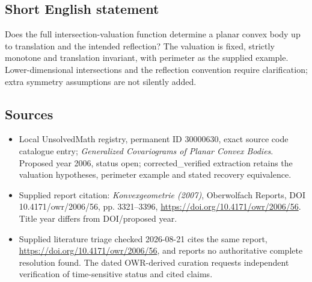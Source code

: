 \documentclass[11pt]{article}
\begin{document}
\subsection{Short English statement}
Does the full intersection-valuation function determine a planar convex body up to translation and the intended reflection? The valuation is fixed, strictly monotone and translation invariant, with perimeter as the supplied example. Lower-dimensional intersections and the reflection convention require clarification; extra symmetry assumptions are not silently added.
\subsection{Sources}
\begin{itemize}
\item Local UnsolvedMath registry, permanent ID 30000630, exact source code catalogue entry; \emph{Generalized Covariograms of Planar Convex Bodies}. Proposed year 2006, status open; corrected\_verified extraction retains the valuation hypotheses, perimeter example and stated recovery equivalence.
\item Supplied report citation: \emph{Konvexgeometrie (2007)}, Oberwolfach Reports, DOI 10.4171/owr/2006/56, pp. 3321--3396, \url{https://doi.org/10.4171/owr/2006/56}. Title year differs from DOI/proposed year.
\item Supplied literature triage checked 2026-08-21 cites the same report, \url{https://doi.org/10.4171/owr/2006/56}, and reports no authoritative complete resolution found. The dated OWR-derived curation requests independent verification of time-sensitive status and cited claims.
\end{itemize}
\end{document}
